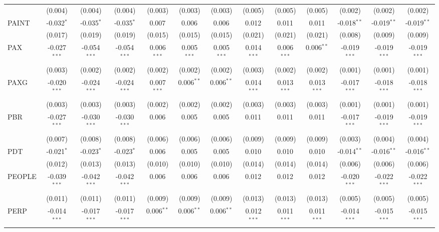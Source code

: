 \begin{table}[!htbp]
\begin{tabular}{@{\extracolsep{5pt}}lcccccccccccc}
  & (0.004) & (0.004) & (0.004) & (0.003) & (0.003) & (0.003) & (0.005) & (0.005) & (0.005) & (0.002) & (0.002) & (0.002) \\
 PAINT & -0.032$^{*}$ & -0.035$^{*}$ & -0.035$^{*}$ & 0.007$^{}$ & 0.006$^{}$ & 0.006$^{}$ & 0.012$^{}$ & 0.011$^{}$ & 0.011$^{}$ & -0.018$^{**}$ & -0.019$^{**}$ & -0.019$^{**}$ \\
  & (0.017) & (0.019) & (0.019) & (0.015) & (0.015) & (0.015) & (0.021) & (0.021) & (0.021) & (0.008) & (0.009) & (0.009) \\
 PAX & -0.027$^{***}$ & -0.054$^{***}$ & -0.054$^{***}$ & 0.006$^{***}$ & 0.005$^{***}$ & 0.005$^{***}$ & 0.014$^{***}$ & 0.006$^{***}$ & 0.006$^{**}$ & -0.019$^{***}$ & -0.019$^{***}$ & -0.019$^{***}$ \\
  & (0.003) & (0.002) & (0.002) & (0.002) & (0.002) & (0.002) & (0.003) & (0.002) & (0.002) & (0.001) & (0.001) & (0.001) \\
 PAXG & -0.020$^{***}$ & -0.024$^{***}$ & -0.024$^{***}$ & 0.007$^{***}$ & 0.006$^{**}$ & 0.006$^{**}$ & 0.014$^{***}$ & 0.013$^{***}$ & 0.013$^{***}$ & -0.017$^{***}$ & -0.018$^{***}$ & -0.018$^{***}$ \\
  & (0.003) & (0.003) & (0.003) & (0.002) & (0.002) & (0.002) & (0.003) & (0.003) & (0.003) & (0.001) & (0.001) & (0.001) \\
 PBR & -0.027$^{***}$ & -0.030$^{***}$ & -0.030$^{***}$ & 0.006$^{}$ & 0.005$^{}$ & 0.005$^{}$ & 0.011$^{}$ & 0.011$^{}$ & 0.011$^{}$ & -0.017$^{***}$ & -0.019$^{***}$ & -0.019$^{***}$ \\
  & (0.007) & (0.008) & (0.008) & (0.006) & (0.006) & (0.006) & (0.009) & (0.009) & (0.009) & (0.003) & (0.004) & (0.004) \\
 PDT & -0.021$^{*}$ & -0.023$^{*}$ & -0.023$^{*}$ & 0.006$^{}$ & 0.005$^{}$ & 0.005$^{}$ & 0.010$^{}$ & 0.010$^{}$ & 0.010$^{}$ & -0.014$^{**}$ & -0.016$^{**}$ & -0.016$^{**}$ \\
  & (0.012) & (0.013) & (0.013) & (0.010) & (0.010) & (0.010) & (0.014) & (0.014) & (0.014) & (0.006) & (0.006) & (0.006) \\
 PEOPLE & -0.039$^{***}$ & -0.042$^{***}$ & -0.042$^{***}$ & 0.006$^{}$ & 0.006$^{}$ & 0.006$^{}$ & 0.012$^{}$ & 0.012$^{}$ & 0.012$^{}$ & -0.020$^{***}$ & -0.022$^{***}$ & -0.022$^{***}$ \\
  & (0.011) & (0.011) & (0.011) & (0.009) & (0.009) & (0.009) & (0.013) & (0.013) & (0.013) & (0.005) & (0.005) & (0.005) \\
 PERP & -0.014$^{***}$ & -0.017$^{***}$ & -0.017$^{***}$ & 0.006$^{**}$ & 0.006$^{**}$ & 0.006$^{**}$ & 0.012$^{***}$ & 0.011$^{***}$ & 0.011$^{***}$ & -0.014$^{***}$ & -0.015$^{***}$ & -0.015$^{***}$ \\

\end{tabular}
\end{table}
